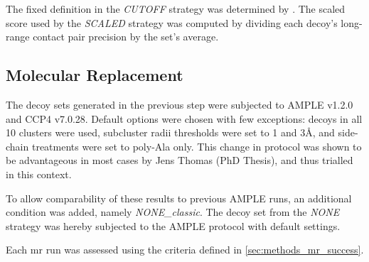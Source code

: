 The fixed definition in the \textit{CUTOFF} strategy was determined by \textcite{De_Oliveira2017-gj}. The scaled score used by the \textit{SCALED} strategy was computed by dividing each decoy's long-range contact pair precision by the set's average.

\subsection{Molecular Replacement}
The decoy sets generated in the previous step were subjected to AMPLE v1.2.0 and CCP4 v7.0.28. Default options were chosen with few exceptions: decoys in all 10 clusters were used, subcluster radii thresholds were set to 1 and 3\AA, and side-chain treatments were set to poly-Ala only. This change in protocol was shown to be advantageous in most cases by Jens Thomas (PhD Thesis), and thus trialled in this context. 

To allow comparability of these results to previous AMPLE runs, an additional condition was added, namely \textit{NONE\_classic}. The decoy set from the \textit{NONE} strategy was hereby subjected to the AMPLE protocol with default settings.

Each \gls{mr} run was assessed using the criteria defined in \cref{sec:methods_mr_success}.

